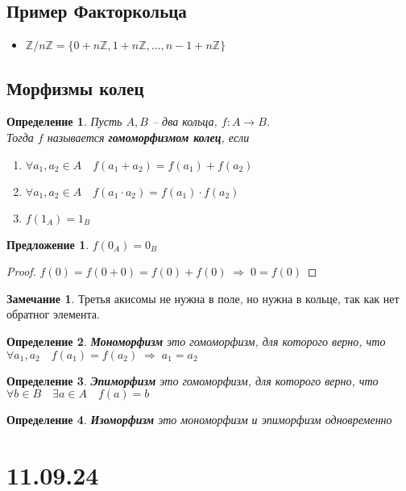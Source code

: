 \documentclass[12pt, a4paper]{article}
\newcommand{\ra}{\;\Rightarrow\;}
\newcommand{\Z}{\mathds{Z}}
\theoremstyle{plain}
\newtheorem{Def}{Определение}
\newtheorem*{Proposition*}{Предложение}
\theoremstyle{definition}
\newtheorem*{Remark*}{Замечание}
\begin{document}
\subsection*{Пример Факторкольца}
\begin{itemize}
    \item $\Z/n\Z = \{0+n\Z,1+n\Z,...,n-1+n\Z\}$ 
\end{itemize}
\subsection*{Морфизмы колец}
\begin{Def}
    Пусть $A,B$ -- два кольца, $f:A\to B$.\\ Тогда $f$ называется \textbf{гомоморфизмом колец}, если
    \begin{enumerate}
        \item $\forall a_1,a_2 \in A\quad f(a_1+a_2) = f(a_1)+f(a_2)$
        \item $\forall a_1,a_2 \in A\quad f(a_1\cdot a_2) = f(a_1)\cdot f(a_2)$
        \item $f(1_A) = 1_B$
    \end{enumerate}
\end{Def}
\begin{Proposition*}
    $f(0_A) = 0_B$
\end{Proposition*}
\begin{proof}
    $f(0) = f(0+0) = f(0)+f(0)\ra 0 = f(0)$
\end{proof}
\begin{Remark*}
    Третья акисомы не нужна в поле, но нужна в кольце, так как нет обратног элемента.
\end{Remark*}
\begin{Def}
    \textbf{Мономорфизм} это гомоморфизм, для которого верно, что\\ $\forall a_1,a_2\quad f(a_1) = f(a_2) \ra a_1 = a_2$
\end{Def}
\begin{Def}
    \textbf{Эпиморфизм} это гомоморфизм, для которого верно, что\\
    $\forall b \in B \quad \exists a\in A\quad f(a) = b$
\end{Def}
\begin{Def}
    \textbf{Изоморфизм} это мономорфизм и эпиморфизм одновременно 
\end{Def}
\section*{11.09.24}
\hypertarget{p3}{}
\end{document}

